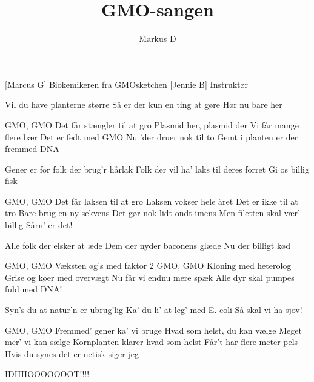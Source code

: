 \documentclass[a4paper,11pt]{article}
\title{GMO-sangen}
\author{Markus D}
\begin{document}
\maketitle

\begin{roles}
[Marcus G] Biokemikeren fra GMOsketchen
[Jennie B] Instruktør
\end{roles}

\begin{song}
Vil du have planterne større 
Så er der kun en ting at gøre
Hør nu bare her

GMO, GMO
Det får stængler til at gro
Plasmid her, plasmid der
Vi får mange flere bær
Det er fedt med GMO
Nu ’der druer nok til to 
Gemt i planten er der fremmed DNA

Gener er for folk der brug’r hårlak
Folk der vil ha’ laks til deres forret
Gi os billig fisk


GMO, GMO
Det får laksen til at gro
Laksen vokser hele året
Det er ikke til at tro
Bare brug en ny sekvens
Det gør nok lidt ondt imens
Men filetten skal vær’ billig
Sårn’ er det!

Alle folk der elsker at æde
Dem der nyder baconens glæde
Nu der billigt kød 

GMO, GMO
Væksten øg’s med faktor 2
GMO, GMO
Kloning med heterolog
Grise og køer med overvægt
Nu får vi endnu mere spæk
Alle dyr skal pumpes fuld med DNA!

Syn’s du at natur'n er ubrug’lig
Ka’ du li’ at leg’ med E. coli
Så skal vi ha sjov!

GMO, GMO
Fremmed' gener ka' vi bruge
Hvad som helst, du kan vælge
Meget mer’ vi kan sælge
Kornplanten klarer hvad som helst
Får't har flere meter pels
Hvis du synes det er uetisk siger jeg

IDIIIIOOOOOOOT!!!!

\end{song}
\end{document}
